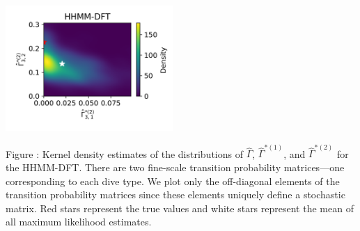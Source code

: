 \documentclass{article}
\begin{document}
\begin{center}
        \includegraphics[width=2.5in]{../Plots/hhmm_FV_uncorr_Gamma_density_1_row_2.png}
        \end{center}
        
        \noindent Figure : Kernel density estimates of the distributions of $\hat \Gamma$, $\hat \Gamma^{*(1)}$, and $\hat \Gamma^{*(2)}$ for the HHMM-DFT. There are two fine-scale transition probability matrices---one corresponding to each dive type. We plot only the off-diagonal elements of the transition probability matrices since these elements uniquely define a stochastic matrix. Red stars represent the true values and white stars represent the mean of all maximum likelihood estimates.
        \addtocounter{fignum}{1}
        
        \newpage
\end{document}
